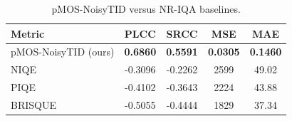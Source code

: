 \begin{table}[htpb]
\centering
\caption{\acs{pMOS-NoisyTID} versus \acs{NR-IQA} baselines.}\label{tab:tid_nr_scores}
\begin{tabular}{lcccc}
\hline
\textbf{Metric}  & \textbf{\acs{PLCC}} & \textbf{\acs{SRCC}} & \textbf{\acs{MSE}} & \textbf{\acs{MAE}} \\
\hline
\acs{pMOS-NoisyTID} (ours)  & \textbf{0.6860} & \textbf{0.5591} & \textbf{0.0305} & \textbf{0.1460} \\
\acs{NIQE}     & -0.3096 & -0.2262 & 2599 & 49.02 \\
\acs{PIQE}     & -0.4102 & -0.3643 & 2224 & 43.88 \\
\acs{BRISQUE}  & -0.5055 & -0.4444 & 1829 & 37.34 \\
\hline
\end{tabular}
\end{table}
